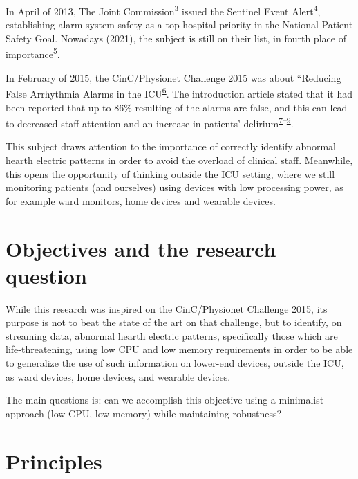 \documentclass[12pt,twoside]{fmupthesis}
\begin{document}
In April of 2013, The Joint Commission\textsuperscript{\protect\hyperlink{ref-the_jc}{3}} issued the Sentinel Event Alert\textsuperscript{\protect\hyperlink{ref-JointCommission2013}{4}}, establishing alarm system safety as a top hospital priority in the National
Patient Safety Goal. Nowadays (2021), the subject is still on their list, in fourth place of
importance\textsuperscript{\protect\hyperlink{ref-the_jc2021}{5}}.

In February of 2015, the CinC/Physionet Challenge 2015 was about ``Reducing False Arrhythmia Alarms
in the ICU\textsuperscript{\protect\hyperlink{ref-Clifford2015}{6}}. The introduction article stated that it had been reported that up to 86\%
resulting of the alarms are false, and this can lead to decreased staff attention and an increase in
patients' delirium\textsuperscript{\protect\hyperlink{ref-Lawless1994}{7}--\protect\hyperlink{ref-Parthasarathy2004}{9}}.

This subject draws attention to the importance of correctly identify abnormal hearth electric patterns
in order to avoid the overload of clinical staff. Meanwhile, this opens the opportunity of thinking
outside the ICU setting, where we still monitoring patients (and ourselves) using devices with
low processing power, as for example ward monitors, home devices and wearable devices.

\hypertarget{objectives-and-the-research-question}{%
\chapter{Objectives and the research question}\label{objectives-and-the-research-question}}

While this research was inspired on the CinC/Physionet Challenge 2015, its purpose is not to beat
the state of the art on that challenge, but to identify, on streaming data, abnormal hearth electric
patterns, specifically those which are life-threatening, using low CPU and low memory requirements
in order to be able to generalize the use of such information on lower-end devices, outside the ICU,
as ward devices, home devices, and wearable devices.

The main questions is: can we accomplish this objective using a minimalist approach (low CPU, low
memory) while maintaining robustness?

\hypertarget{principles}{%
\chapter{Principles}\label{principles}}
\end{document}
